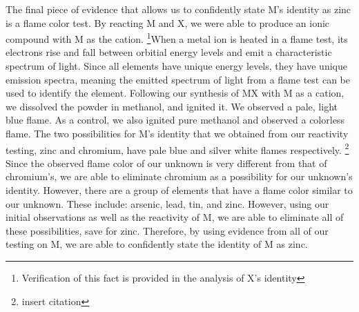 \documentclass[titlepage]{article}
\begin{document}
The final piece of evidence that allows us to confidently state M's identity as zinc is a flame color test. By reacting M and X, we were able to produce an ionic compound with M as the cation. \footnote{Verification of this fact is provided in the analysis of X's identity}When a metal ion is heated in a flame test, its electrons rise and fall between orbitial energy levels and emit a characteristic spectrum of light. Since all elements have unique energy levels, they have unique emission spectra, meaning the emitted spectrum of light from a flame test can be used to identify the element. Following our synthesis of MX with M as a cation, we dissolved the powder in methanol, and ignited it. We observed a pale, light blue flame. As a control, we also ignited pure methanol and observed a colorless flame. The two possibilities for M's identity that we obtained from our reactivity testing, zinc and chromium, have pale blue and silver white flames respectively. \footnote{insert citation} Since the observed flame color of our unknown is very different from that of chromium's, we are able to eliminate chromium as a possibility for our unknown's identity. However, there are a group of elements that have a flame color similar to our unknown. These include: arsenic, lead, tin, and zinc. However, using our initial observations as well as the reactivity of M, we are able to eliminate all of these possibilities, save for zinc. Therefore, by using evidence from all of our testing on M, we are able to confidently state the identity of M as zinc.





% 
% 
% 
\end{document}
